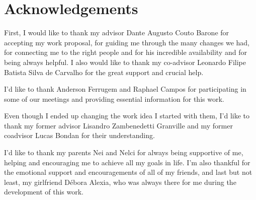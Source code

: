 \chapter*{Acknowledgements}

First, I would like to thank my advisor Dante Augusto Couto Barone for accepting my work proposal, for guiding me through the many changes we had, for connecting me to the right people and for his incredible availability and for being always helpful. I also would like to thank my co-advisor Leonardo Filipe Batista Silva de Carvalho for the great support and crucial help. 

I'd like to thank Anderson Ferrugem and Raphael Campos for participating in some of our meetings and providing essential information for this work.

Even though I ended up changing the work idea I started with them, I'd like to thank my former advisor Lisandro Zambenedetti Granville and my former coadvisor Lucas Bondan for their understanding.

I'd like to thank my parents Nei and Nelci for always being supportive of me, helping and encouraging me to achieve all my goals in life. I'm also thankful for the emotional support and encouragements of all of my friends, and last but not least, my girlfriend Débora Alexia, who was always there for me during the development of this work.
\clearpage